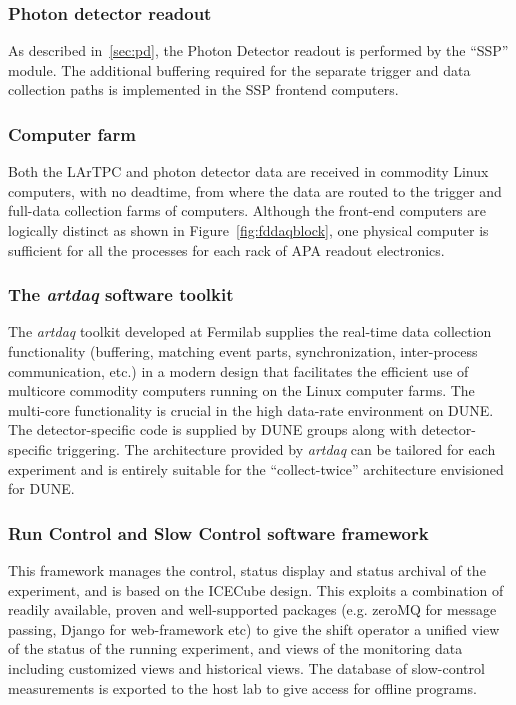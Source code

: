 \subsubsection{Photon detector readout}

As described in~\ref{sec:pd}, the Photon Detector readout  is performed by the ``SSP'' module.
 The additional buffering required for the separate trigger and data collection paths
is implemented in the SSP frontend computers.

\subsubsection{Computer farm}
Both the LArTPC and photon detector data are
received in commodity Linux computers, with no deadtime, from where
the data are routed to the trigger and full-data collection farms of
computers.  Although the front-end computers are logically distinct as
shown in Figure~\ref{fig:fddaqblock}, one physical computer is
sufficient for all the processes for each rack of APA readout
electronics. 

\subsubsection{The \textit{artdaq} software toolkit}

The \textit{artdaq} toolkit developed at  Fermilab supplies the real-time
data collection functionality (buffering, matching event parts,
synchronization, inter-process communication, etc.) in a modern
design that facilitates the efficient use of multicore commodity
computers running on the Linux computer farms.  The multi-core
functionality is crucial in the high data-rate environment on DUNE.  
The detector-specific code is supplied by DUNE groups
along with detector-specific triggering.
The architecture
provided by \textit{artdaq} can be tailored for each experiment and is entirely
suitable for the ``collect-twice'' architecture envisioned for DUNE.

\subsubsection{Run Control and Slow Control software framework}

This framework manages the control, status display and status archival of the experiment,
and is based on the ICECube design.  This exploits a combination of readily available, proven and
well-supported packages (e.g. zeroMQ for message passing, Django for web-framework etc) 
to give the shift operator a unified view of the status
of the running experiment, and views of the monitoring data including
customized views and historical views.  The database of slow-control
measurements is exported to the host lab to give access for offline
programs.

